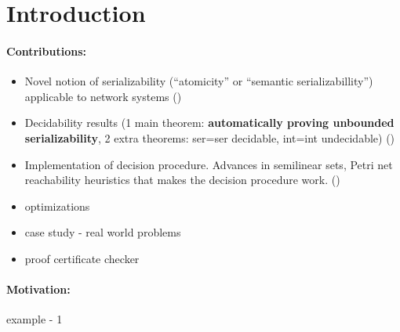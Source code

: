 \section{Introduction}
\label{sec:introduction}






\paragraph{Contributions:}
\begin{itemize}
    \item Novel notion of serializability (``atomicity'' or ``semantic serializabillity'') applicable to network systems ()
    \item Decidability results (1 main theorem: \textbf{automatically proving unbounded serializability}, 2 extra theorems: ser=ser decidable, int=int undecidable) ()
    \item Implementation of decision procedure. Advances in semilinear sets, Petri net reachability heuristics that makes the decision procedure work. ()
     \item optimizations
     \item case study - real world problems
     \item proof certificate checker
\end{itemize}

\newpage


\paragraph{Motivation:}

example - 1

	
	
